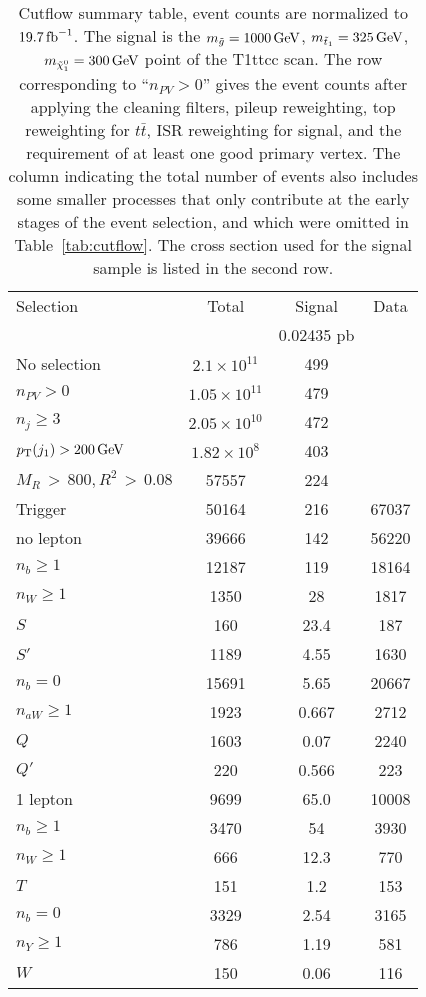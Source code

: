 \begin{table}[p]
\centering
\caption{Cutflow summary table, event counts are normalized to $19.7\mbox{\ensuremath{\,\text{fb}^\text{$-$1}}}$. The signal is the
$m_{\tilde{g}}=1000\,\text{Ge\hspace{-.08em}V}$, $m_{\tilde{t}_1}=325\,\text{Ge\hspace{-.08em}V}$, $m_{\tilde{\chi}_1^0}=300\,\text{Ge\hspace{-.08em}V}$ point of the
T1ttcc scan. The row corresponding to ``$n_{PV} > 0$'' gives the event counts after applying the
cleaning filters, pileup reweighting, top \pt reweighting for $t\bar{t}$, ISR reweighting for
signal, and the requirement of at least one good primary vertex. The column indicating the total
number of events also includes some smaller processes that only contribute at the early stages of
the event selection, and which were omitted in Table~\ref{tab:cutflow}. 
The cross section used for the signal sample is listed in the second row.}
\vspace{1eM}
{\normalsize
\begin{tabular}{ l | c  c  c }
\toprule
Selection & Total & Signal & Data\\ 
 & & 0.02435 pb & \\ 
 \midrule
No selection & $2.1\times 10^{11}$ & 499 &  \\
$n_{PV} > 0$ & $1.05\times 10^{11}$ & 479 & \\
$n_j \geq 3$ & $2.05\times 10^{10}$ & 472 &  \\
$p_{\mathrm{T}}(j_1) > 200\,\text{Ge\hspace{-.08em}V}$ & $1.82\times 10^8$ & 403 & \\
$M_R \,{>}\, 800, R^2 \,{>}\, 0.08$ & 57557 & 224 &\\
Trigger & 50164 & 216 & 67037 \\
\midrule
no lepton & 39666 & 142 & 56220 \\
\midrule[.02em]
$n_b \geq 1$ & 12187 & 119 & 18164 \\
$n_W \geq 1$ & 1350 & 28 & 1817  \\
$S$ & 160 & 23.4 & 187 \\
$S'$ & 1189 & 4.55 & 1630 \\
\midrule[.02em]
$n_b = 0$ & 15691 & 5.65 & 20667 \\
$n_{aW} \geq 1$ & 1923 & 0.667 & 2712 \\
$Q$ & 1603 & 0.07 & 2240 \\
$Q'$ & 220 & 0.566 & 223 \\
\midrule
1 lepton & 9699 & 65.0 & 10008 \\
\midrule[.02em]
$n_b \geq 1$ & 3470 & 54 & 3930 \\
$n_W \geq 1$ & 666 & 12.3 & 770 \\
$T$ & 151 & 1.2 & 153 \\
\midrule[.02em]
$n_b = 0$ & 3329 & 2.54 & 3165 \\
$n_Y \geq 1$ & 786 & 1.19 & 581 \\
$W$ & 150 & 0.06 & 116 \\
\bottomrule
\end{tabular}
}
\label{tab:cutflow_summary}
\end{table}

